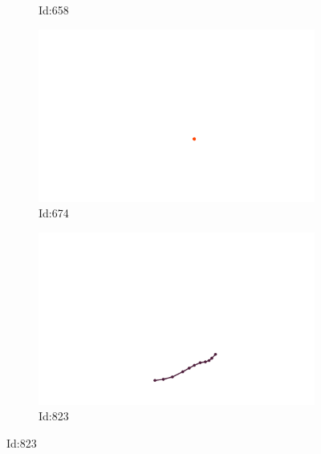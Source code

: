 \documentclass[12pt,twoside]{report}
\begin{document}
\begin{figure}
\begin{subfigure}[b]{0.20\textwidth}
\caption{Id:658}
\end{subfigure}
\begin{subfigure}[b]{0.20\textwidth}
\centering
\includegraphics[width=\textwidth]{../../trajectories/674.png}
\caption{Id:674}
\end{subfigure}
\begin{subfigure}[b]{0.20\textwidth}
\centering
\includegraphics[width=\textwidth]{../../trajectories/823.png}
\caption{Id:823}
\end{subfigure}
\end{figure}
\end{document}
